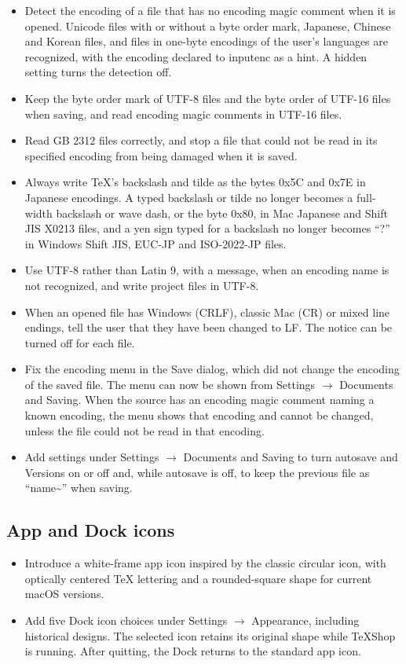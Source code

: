 \documentclass[11pt,letterpaper]{article}
\begin{document}
\begin{itemize}
\item Detect the encoding of a file that has no encoding magic comment when it is opened. Unicode files with or without a byte order mark, Japanese, Chinese and Korean files, and files in one-byte encodings of the user’s languages are recognized, with the encoding declared to inputenc as a hint. A hidden setting turns the detection off.
\item Keep the byte order mark of UTF-8 files and the byte order of UTF-16 files when saving, and read encoding magic comments in UTF-16 files.
\item Read GB 2312 files correctly, and stop a file that could not be read in its specified encoding from being damaged when it is saved.
\item Always write TeX’s backslash and tilde as the bytes 0x5C and 0x7E in Japanese encodings. A typed backslash or tilde no longer becomes a full-width backslash or wave dash, or the byte 0x80, in Mac Japanese and Shift JIS X0213 files, and a yen sign typed for a backslash no longer becomes “?” in Windows Shift JIS, EUC-JP and ISO-2022-JP files.
\item Use UTF-8 rather than Latin 9, with a message, when an encoding name is not recognized, and write project files in UTF-8.
\item When an opened file has Windows (CRLF), classic Mac (CR) or mixed line endings, tell the user that they have been changed to LF. The notice can be turned off for each file.
\item Fix the encoding menu in the Save dialog, which did not change the encoding of the saved file. The menu can now be shown from Settings \(\rightarrow\) Documents and Saving. When the source has an encoding magic comment naming a known encoding, the menu shows that encoding and cannot be changed, unless the file could not be read in that encoding.
\item Add settings under Settings \(\rightarrow\) Documents and Saving to turn autosave and Versions on or off and, while autosave is off, to keep the previous file as “name\textasciitilde{}” when saving.
\end{itemize}

\subsection{App and Dock icons}

\begin{itemize}
\item Introduce a white-frame app icon inspired by the classic circular icon, with optically centered TeX lettering and a rounded-square shape for current macOS versions.
\item Add five Dock icon choices under Settings \(\rightarrow\) Appearance, including historical designs. The selected icon retains its original shape while TeXShop is running. After quitting, the Dock returns to the standard app icon.
\end{itemize}
\end{document}
